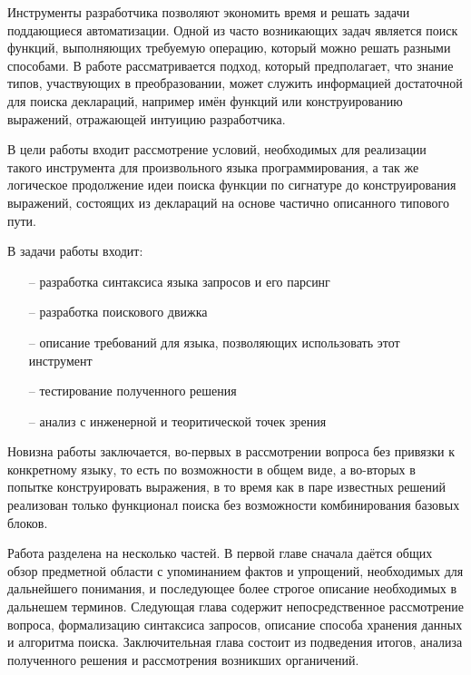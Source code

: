 \documentclass[times]{itmo-student-thesis}
\begin{document}
	
	\researchfunding{}
	\researchpublications{}
	
	
	\tableofcontents
	
	\startprefacepage
	Инструменты разработчика позволяют экономить время и решать задачи поддающиеся автоматизации. Одной из часто возникающих задач является поиск функций, выполняющих требуемую операцию, который можно решать разными способами. В работе рассматривается подход, который предполагает, что знание типов, участвующих в преобразовании, может служить информацией достаточной для поиска деклараций, например имён функций или конструированию выражений, отражающей интуицию разработчика.
	
	В цели работы входит рассмотрение условий, необходимых для реализации такого инструмента для произвольного языка программирования, а так же логическое продолжение идеи поиска функции по сигнатуре до конструирования выражений, состоящих из деклараций на основе частично описанного типового пути. 
	
	В задачи работы входит:
	\begin{enumerate} 
		\item[--]  разработка синтаксиса языка запросов и его парсинг
		\item[--]  разработка поискового движка
		\item[--] описание требований для языка, позволяющих использовать этот инструмент
		\item[--] тестирование полученного решения
		\item[--] анализ с инженерной и теоритической точек зрения
	\end{enumerate}
	
	
	Новизна работы заключается, во-первых в рассмотрении вопроса без привязки к конкретному языку, то есть по возможности в общем виде, а во-вторых в попытке конструировать выражения, в то время как в паре известных решений реализован только функционал поиска без возможности комбинирования базовых блоков.
	
	Работа разделена на несколько частей. В первой главе сначала даётся общих обзор предметной области с упоминанием фактов и упрощений, необходимых для дальнейшего понимания, и последующее более строгое описание необходимых в дальнешем терминов. Следующая глава содержит непосредственное рассмотрение вопроса, формализацию синтаксиса запросов, описание способа хранения данных и алгоритма поиска. Заключительная глава состоит из подведения итогов, анализа полученного решения и рассмотрения возникших органичений.
	
\end{document}
